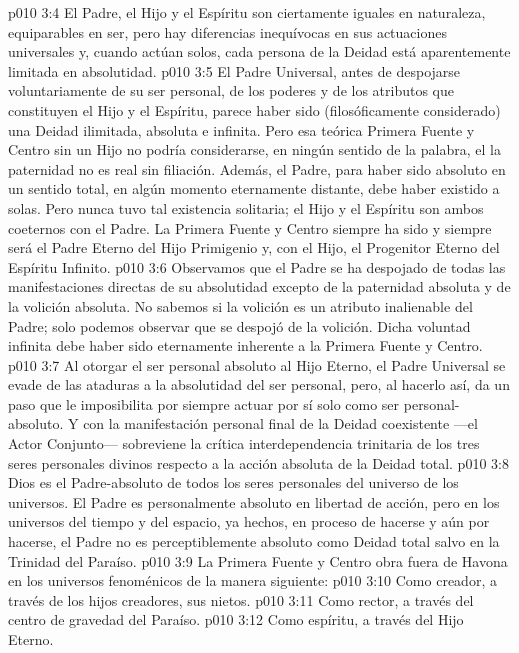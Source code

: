 \vs p010 3:4 El Padre, el Hijo y el Espíritu son ciertamente iguales en naturaleza, equiparables en ser, pero hay diferencias inequívocas en sus actuaciones universales y, cuando actúan solos, cada persona de la Deidad está aparentemente limitada en absolutidad.
\vs p010 3:5 \pc El Padre Universal, antes de despojarse voluntariamente de su ser personal, de los poderes y de los atributos que constituyen el Hijo y el Espíritu, parece haber sido (filosóficamente considerado) una Deidad ilimitada, absoluta e infinita. Pero esa teórica Primera Fuente y Centro sin un Hijo no podría considerarse, en ningún sentido de la palabra, el  la paternidad no es real sin filiación. Además, el Padre, para haber sido absoluto en un sentido total, en algún momento eternamente distante, debe haber existido a solas. Pero nunca tuvo tal existencia solitaria; el Hijo y el Espíritu son ambos coeternos con el Padre. La Primera Fuente y Centro siempre ha sido y siempre será el Padre Eterno del Hijo Primigenio y, con el Hijo, el Progenitor Eterno del Espíritu Infinito.
\vs p010 3:6 Observamos que el Padre se ha despojado de todas las manifestaciones directas de su absolutidad excepto de la paternidad absoluta y de la volición absoluta. No sabemos si la volición es un atributo inalienable del Padre; solo podemos observar que  se despojó de la volición. Dicha voluntad infinita debe haber sido eternamente inherente a la Primera Fuente y Centro.
\vs p010 3:7 Al otorgar el ser personal absoluto al Hijo Eterno, el Padre Universal se evade de las ataduras a la absolutidad del ser personal, pero, al hacerlo así, da un paso que le imposibilita por siempre actuar por sí solo como ser personal\hyp{}absoluto. Y con la manifestación personal final de la Deidad coexistente ---el Actor Conjunto--- sobreviene la crítica interdependencia trinitaria de los tres seres personales divinos respecto a la acción absoluta de la Deidad total.
\vs p010 3:8 Dios es el Padre\hyp{}absoluto de todos los seres personales del universo de los universos. El Padre es personalmente absoluto en libertad de acción, pero en los universos del tiempo y del espacio, ya hechos, en proceso de hacerse y aún por hacerse, el Padre no es perceptiblemente absoluto como Deidad total salvo en la Trinidad del Paraíso.
\vs p010 3:9 \pc La Primera Fuente y Centro obra fuera de Havona en los universos fenoménicos de la manera siguiente:
\vs p010 3:10 Como creador, a través de los hijos creadores, sus nietos.
\vs p010 3:11 Como rector, a través del centro de gravedad del Paraíso.
\vs p010 3:12 Como espíritu, a través del Hijo Eterno.
